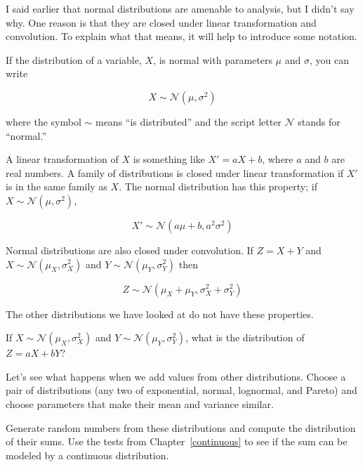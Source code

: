 \documentclass[12pt]{book}
\begin{document}
I said earlier that normal distributions are amenable to analysis,
but I didn't say why.  One reason is that they are
closed under linear transformation and convolution.  To explain what
that means, it will help to introduce some notation.

If the distribution of a variable, $X$, is
normal with parameters $\mu$ and $\sigma$, you can write

\newcommand{\normal}{\mathcal{N}}
\newcommand{\hasdist}{\sim}

\[ X \hasdist \normal (\mu, \sigma^2) \]

where the symbol $\hasdist$ means ``is distributed'' and the script letter
$\normal$ stands for ``normal.''


A linear transformation of $X$ is something like $X' = aX + b$, where $a$
and $b$ are real numbers.  A family of distributions is closed under
linear transformation if $X'$ is in the same family as $X$.  The normal
distribution has this property; if $X \hasdist \normal (\mu,
\sigma^2)$,

\[ X' \hasdist \normal (a \mu + b, a^2 \sigma^2) \]

Normal distributions are also closed under convolution.  
If $Z = X+Y$ and
$X \hasdist \normal (\mu_X, \sigma_X^2)$ and
$Y \hasdist \normal (\mu_Y, \sigma_Y^2)$ then

\[ Z \hasdist \normal (\mu_X + \mu_Y, \sigma_X^2 + \sigma_Y^2) \]

The other distributions we have looked at do not have these
properties.

\begin{ex}

If 
$X \hasdist \normal (\mu_X, \sigma_X^2)$ and
$Y \hasdist \normal (\mu_Y, \sigma_Y^2)$, what is the distribution
of $Z = aX + bY$?

\end{ex}

\begin{ex}

Let's see what happens when we add values from
other distributions.  Choose a pair of distributions (any two of
exponential, normal, lognormal, and Pareto) and choose parameters
that make their mean and variance similar.

Generate random numbers from these distributions and compute the
distribution of their sums.  Use the tests from
Chapter~\ref{continuous} to see if the sum can be modeled by a
continuous distribution.

\end{ex}
\end{document}
